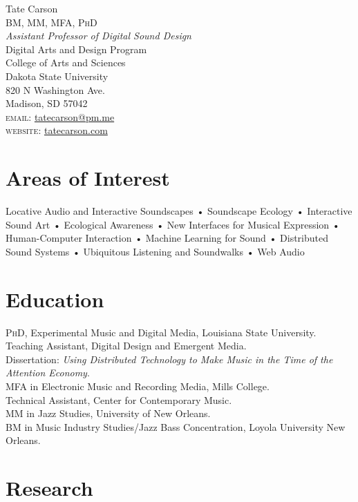 \documentclass[10pt, a4paper]{article}
\newcommand{\years}[1]{\marginnote{\scriptsize #1}}
\begin{document}
{\Huge Tate Carson}\\[0.1cm]
\textsc{BM, MM, MFA, PhD}\\[0.9cm]
\emph{Assistant Professor of Digital Sound Design}\\
Digital Arts and Design Program \\
College of Arts and Sciences\\
Dakota State University \\ 
820 N Washington Ave.\\
Madison, SD 57042 \\[.2cm]

\textsc{email}: \href{mailto:tatecarson@pm.me}{tatecarson@pm.me}\\
\textsc{website}: \href{https://tatecarson.com}{tatecarson.com}


\section*{Areas of Interest}
Locative Audio and Interactive Soundscapes • Soundscape Ecology • Interactive Sound Art • Ecological Awareness • New Interfaces for Musical Expression • Human-Computer Interaction • Machine Learning for Sound • Distributed Sound Systems • Ubiquitous Listening and Soundwalks • Web Audio



\section*{Education}
\noindent
\years{2021}\textsc{PhD}, Experimental Music and Digital Media, Louisiana State University.\\
Teaching Assistant, Digital Design and Emergent Media. \\
Dissertation: \emph{Using Distributed Technology to Make Music in the Time of the Attention Economy}.\\
\years{2017}\textsc{MFA} in Electronic Music and Recording Media, Mills College.\\
Technical Assistant, Center for Contemporary Music.\\
\years{2011}\textsc{MM} in Jazz Studies, University of New Orleans.\\
\years{2009}\textsc{BM} in Music Industry Studies/Jazz Bass Concentration, Loyola University New Orleans.

\section*{Research}
\end{document}
